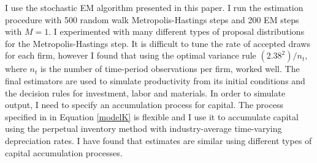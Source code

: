 \documentclass{article}
\begin{document}
I use the stochastic EM algorithm presented in this paper. I run the estimation procedure with 500 random walk Metropolis-Hastings steps and 200 EM steps with $M=1$. I experimented with many different types of proposal distributions for the Metropolis-Hastings step. It is difficult to tune the rate of accepted draws for each firm, however I found that using the optimal variance rule $(2.38^2)/n_{t}$, where $n_{t}$ is the number of time-period observations per firm, worked well. The final estimators are used to simulate productivity from its initial conditions and the decision rules for investment, labor and materials. In order to simulate output, I need to specify an accumulation process for capital. The process specified in in Equation \ref{modelK} is flexible and I use it to accumulate capital using the perpetual inventory method with industry-average time-varying depreciation rates. I have found that estimates are similar using different types of capital accumulation processes.\\
\end{document}
